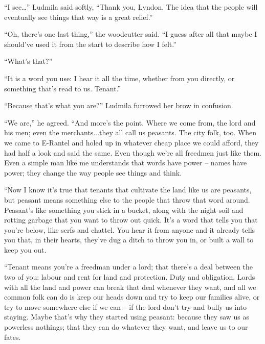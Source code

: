  

“I see…” Ludmila said softly, “Thank you, Lyndon. The idea that the people will eventually see things that way is a great relief.”

 

“Oh, there’s one last thing,” the woodcutter said. “I guess after all that maybe I should’ve used it from the start to describe how I felt.”

 

“What’s that?”

 

“It is a word you use: I hear it all the time, whether from you directly, or something that’s read to us. Tenant.”

 

“Because that’s what you are?” Ludmila furrowed her brow in confusion.

 

“We are,” he agreed. “And more’s the point. Where we come from, the lord and his men; even the merchants...they all call us peasants. The city folk, too. When we came to E-Rantel and holed up in whatever cheap place we could afford, they had half a look and said the same. Even though we’re all freedmen just like them. Even a simple man like me understands that words have power – names have power; they change the way people see things and think.

 

“Now I know it’s true that tenants that cultivate the land like us are peasants, but peasant means something else to the people that throw that word around. Peasant’s like something you stick in a bucket, along with the night soil and rotting garbage that you want to throw out quick. It’s a word that tells you that you’re below, like serfs and chattel. You hear it from anyone and it already tells you that, in their hearts, they’ve dug a ditch to throw you in, or built a wall to keep you out.

 

“Tenant means you’re a freedman under a lord; that there’s a deal between the two of you: labour and rent for land and protection. Duty and obligation. Lords with all the land and power can break that deal whenever they want, and all we common folk can do is keep our heads down and try to keep our families alive, or try to move somewhere else if we can – if the lord don’t try and bully us into staying. Maybe that’s why they started using peasant: because they saw us as powerless nothings; that they can do whatever they want, and leave us to our fates.

